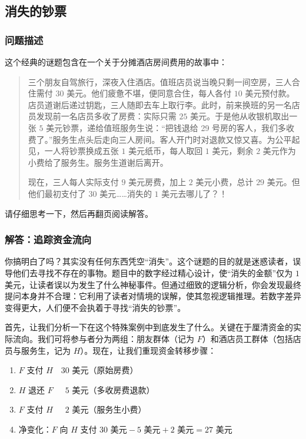 \subsection{消失的钞票}

\subsubsection*{问题描述}

这个经典的谜题包含在一个关于分摊酒店房间费用的故事中：

\begin{quote}
    三个朋友自驾旅行，深夜入住酒店。值班店员说当晚只剩一间空房，三人合住需付 $30$ 美元。他们疲惫不堪，便同意合住，每人各付 $10$ 美元预付款。店员道谢后递过钥匙，三人随即去车上取行李。此时，前来换班的另一名店员发现前一名店员多收了房费：实际只需 $25$ 美元。于是他从收银机取出一张 $5$ 美元钞票，递给值班服务生说：``把钱退给 29 号房的客人，我们多收费了。''服务生点头后走向三人房间。客人开门时对退款又惊又喜。为公平起见，一人将钞票换成五张 $1$ 美元纸币，每人取回 $1$ 美元，剩余 $2$ 美元作为小费给了服务生。服务生道谢后离开。

    现在，三人每人实际支付 $9$ 美元房费，加上 $2$ 美元小费，总计 $29$ 美元。但他们最初支付了 $30$ 美元……消失的 $1$ 美元去哪儿了？！
\end{quote}

请仔细思考一下，然后再翻页阅读解答。

\clearpage

\subsubsection*{解答：追踪资金流向}

你搞明白了吗？其实没有任何东西凭空``消失''。这个谜题的目的就是迷惑读者，误导他们去寻找不存在的事物。题目中的数字经过精心设计，使``消失的金额''仅为 $1$ 美元，让读者误以为发生了什么神秘事件。但通过细致的逻辑分析，你会发现最终提问本身并不合理：它利用了读者对情境的误解，使其忽视逻辑推理。若数字差异变得更大，人们便不会执着于寻找``消失的钞票''。

首先，让我们分析一下在这个特殊案例中到底发生了什么。关键在于厘清资金的实际流向。我们可将参与者分为两组：朋友群体（记为 $F$）和酒店员工群体（包括店员与服务生，记为 $H$）。现在，让我们重现资金转移步骤：

\begin{enumerate}
    \item $F$ 支付 $H \quad 30$ 美元（原始房费）
    \item $H$ 退还 $F \quad \enspace 5$ 美元（多收房费退款）
    \item $F$ 支付 $H \quad \enspace 2$ 美元（服务生小费）
    \item 净变化：$F$ 向 $H$ 支付 $30 \text{\ 美元} -5 \text{\ 美元} + 2 \text{\ 美元} = 27 \text{\ 美元}$
\end{enumerate}


